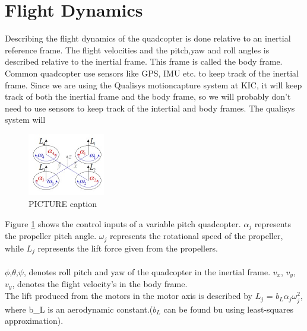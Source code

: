 \section{Flight Dynamics}
Describing the flight dynamics of the quadcopter is done relative to an inertial reference frame. The flight velocities and the pitch,yaw and roll angles is described relative to the inertial frame. This frame is called the body frame. Common quadcopter use sensors like GPS, IMU etc. to keep track of the inertial frame. Since we are using the Qualisys motioncapture system at KIC, it will keep track of both the inertial frame and the body frame, so we will probably don't need to use sensors to keep track of the intertial and body frames. The qualisys system will 

\begin{figure}[H]
    \centering
    \includegraphics[width = 0.3\textwidth]{VAPIQ-PICTURES/Quadcopter.jpg}
    \caption{PICTURE caption}
    \label{fig:quadDynamics}
\end{figure}

Figure \ref{fig:quadDynamics} shows the control inputs of a variable pitch quadcopter. $\alpha_j$ represents the propeller pitch angle. $\omega_j$ represents the rotational speed of the propeller, while $L_j$ represents the lift force given from the propellers.\\ \\
$\phi$,$\theta$,$\psi$, denotes roll pitch and yaw of the quadcopter in the inertial frame. $v_x$, $v_y$, $v_y$, denotes the flight velocity's in the body frame.\\ 
The lift produced from the motors in the motor axis is described by $L_j$ = $b_L\alpha_j\omega_j^2$, where b_L is an aerodynamic constant.($b_L$ can be found bu using least-squares approximation). 